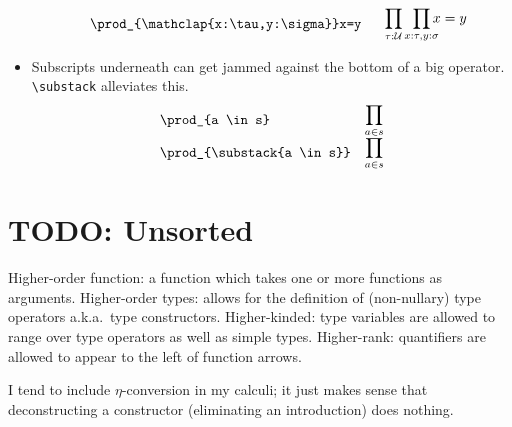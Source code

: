 \documentclass[11pt]{article} %
\makeatletter
\newcommand\ldisplaycell[1]{\begin{array}[c]{@{}l@{}}\displaystyle {#1}\end{array}}
\theoremstyle{definition}
\theoremstyle{remark}
\makeatother
\begin{document}
\begin{itemize}
\[\begin{array}{lll}
\begin{array}[c]{@{}l@{}}
        \quad\verb/\prod_{\mathclap{x:\tau,y:\sigma}}x=y/
      \end{array} & \ldisplaycell{\;\:\,
        \prod_{\tau:\U}\;\;\prod_{\mathclap{ x:\tau,y:\sigma}}x=y } \\
  \end{array}\]
\item
  Subscripts underneath can get jammed against the bottom of a big operator.
  \verb!\substack! alleviates this.
  \[\begin{array}{lll}
    \verb/\prod_{a \in s}/ & \ldisplaycell{ \prod_{a \in s} } \\
    \verb/\prod_{\substack{a \in s}}/ & \ldisplaycell{ \prod_{\substack{a \in s}} } \\
  \end{array}\]
\end{itemize}





\part{TODO: Unsorted}


Higher-order function: a function which takes one or more functions as arguments.
Higher-order types: allows for the definition of (non-nullary) type operators a.k.a.\ type constructors.
Higher-kinded: type variables are allowed to range over type operators as well as simple types.
Higher-rank: quantifiers are allowed to appear to the left of function arrows.

I tend to include $\eta$-conversion in my calculi; it just makes sense that deconstructing a constructor (eliminating an introduction) does nothing.
\end{document}
